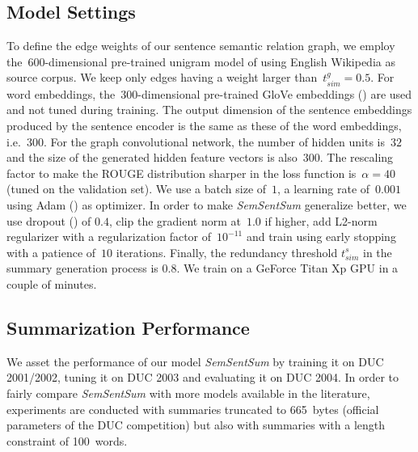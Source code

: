 \documentclass{article}
\begin{document}
\subsection{Model Settings}

To define the edge weights of our sentence semantic relation graph, we employ the~$600$-dimensional pre-trained unigram model of \citet{pgj2017unsup} using English Wikipedia as source corpus. We keep only edges having a weight larger than~$t_{sim}^g = 0.5$. For word embeddings, the~$300$-dimensional pre-trained GloVe embeddings (\citet{pennington2014glove}) are used and not tuned during training.
The output dimension of the sentence embeddings produced by the sentence encoder is the same as these of the word embeddings, i.e.~$300$. For the graph convolutional network, the number of hidden units is~$32$ and the size of the generated hidden feature vectors is also~$300$. The rescaling factor to make the ROUGE distribution sharper in the loss function is~$\alpha=40$ (tuned on the validation set). We use a batch size of~$1$, a learning rate of~$0.001$ using Adam (\citet{KingmaB14}) as optimizer. In order to make \textit{SemSentSum} generalize better, we use dropout (\citet{Srivastava2014}) of $0.4$, clip the gradient norm at~$1.0$ if higher, add L2-norm regularizer with a regularization factor of~$10^{-11}$ and train using early stopping with a patience of~$10$ iterations. Finally, the redundancy threshold $t_{sim}^s$ in the summary generation process is $0.8$. We train on a GeForce Titan Xp GPU in a couple of minutes.

\subsection{Summarization Performance}

We asset the performance of our model \textit{SemSentSum} by training it on DUC 2001/2002, tuning it on DUC 2003 and evaluating it on DUC 2004. In order to fairly compare \textit{SemSentSum} with more models available in the literature, experiments are conducted with summaries truncated to 665~bytes (official parameters of the DUC competition) but also with summaries with a length constraint of 100~words. %
\end{document}
